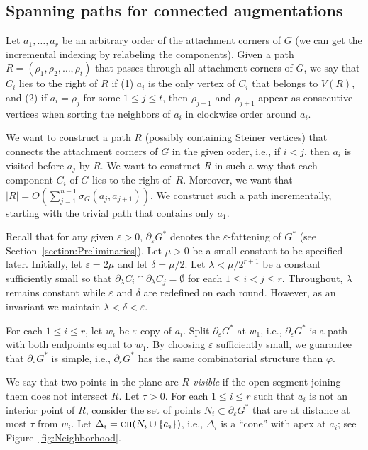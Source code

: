 \documentclass[a4paper, 11pt]{article}
\newcommand{\ch}[1]{\ensuremath{\textsc{ch}(#1)}}
\begin{document}
\subsection{Spanning paths for connected augmentations}\label{section:Spanning paths for connected augmentations}
Let $a_1, \ldots, a_r$ be an arbitrary order of the attachment corners of $G$ (we can get the incremental indexing by relabeling the components). 
Given a path $R = (\rho_1, \rho_2, \ldots, \rho_t)$ that passes through all attachment corners of $G$, we say that $C_i$ lies to the right of $R$ if (1) $a_i$ is the only vertex of $C_i$ that belongs to $V(R)$, and (2) if $a_i = \rho_j$ for some $1\leq j\leq t$, then $\rho_{j-1}$ and $\rho_{j+1}$ appear as consecutive vertices when sorting the neighbors of $a_i$ in clockwise order around $a_i$.

We want to construct a path $R$ (possibly containing Steiner vertices) that connects the attachment corners of $G$ in the given order, i.e., if $i < j$, then $a_i$ is visited before $a_j$ by $R$.
We want to construct $R$ in such a way that each component $C_i$ of $G$ lies to the right of~$R$.
Moreover, we want that $|R| = O(\sum_{j=1}^{n-1} \sigma_G(a_j, a_{j+1}))$.
We construct such a path incrementally, starting with the trivial path that contains only $a_1$.

Recall that  for any given $\varepsilon >0$, $\partial_\varepsilon G^*$ denotes the $\varepsilon$-fattening of $G^*$ (see Section~\ref{section:Preliminaries}). 
Let $\mu>0$ be a small constant to be specified later.
Initially, let $\varepsilon = 2\mu$ and let $\delta = \mu/2$. Let $\lambda < \mu/2^{r+1}$ be a constant sufficiently small so that $\partial_\lambda C_i \cap \partial_\lambda C_j = \emptyset$ for each $1\leq i< j\leq r$.
Throughout, $\lambda$ remains constant while $\varepsilon$ and $\delta$ are redefined on each round. However, as an invariant we maintain $\lambda < \delta < \varepsilon$.

For each $1\leq i\leq r$, let $w_i$ be $\varepsilon$-copy of  $a_i$.
Split $\partial_\varepsilon G^*$ at $w_1$, i.e., $\partial_\varepsilon G^*$ is a path with both endpoints equal to $w_1$.
By choosing $\varepsilon$ sufficiently small, we guarantee that $\partial_\varepsilon G^*$ is simple, i.e., $\partial_\varepsilon G^*$ has the same combinatorial structure than $\varphi$.

We say that two points in the plane are \emph{$R$-visible} if the open segment joining them does not intersect $R$.
Let $\tau >0$. For each $1\leq i\leq r$ such that $a_i$ is not an interior point of $R$, consider the set of points $N_i\subset \partial_\varepsilon G^*$ that are at distance at most $\tau$ from $w_i$. 
Let $\Delta_i = \ch{N_i\cup \{a_i\}}$, i.e., $\Delta_i$ is a ``cone'' with apex at $a_i$; see Figure~\ref{fig:Neighborhood}.
\end{document}
